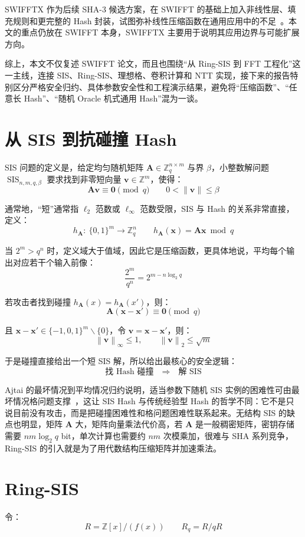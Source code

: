 \documentclass{article}
\newcommand{\norm}[1]{\left\lVert #1 \right\rVert}
\begin{document}
SWIFFTX 作为后续 SHA-3 候选方案，在 SWIFFT 的基础上加入非线性层、填充规则和更完整的 Hash 封装，试图弥补线性压缩函数在通用应用中的不足~\cite{SWIFFTX}。本文的重点仍放在 SWIFFT 本身，SWIFFTX 主要用于说明其应用边界与可能扩展方向。

综上，本文不仅复述 SWIFFT 论文，而且也围绕“从 Ring-SIS 到 FFT 工程化”这一主线，连接 SIS、Ring-SIS、理想格、卷积计算和 NTT 实现，接下来的报告特别区分严格安全归约、具体参数安全性和工程演示结果，避免将“压缩函数”、“任意长 Hash”、“随机 Oracle 机式通用 Hash”混为一谈。



\section{从 SIS 到抗碰撞 Hash}
SIS 问题的定义是，给定均匀随机矩阵 $\bm{A}\in\mathbb{Z}_{q}^{n\times m}$ 与界 $\beta$，小整数解问题 $\operatorname{SIS}_{n,m,q,\beta}$ 要求找到非零短向量 $\bm{v}\in\mathbb{Z}^{m}$，使得：
\[ \bm{A}\bm{v}\equiv\bm{0}\pmod q\qquad 0<\|\bm{v}\|\leqslant\beta \]

通常地，“短”通常指 $\ell_2$ 范数或 $\ell_{\infty}$ 范数受限，SIS 与 Hash 的关系非常直接，定义：
\[ h_{\bm{A}}:\ \{0,1\}^{m}\to\mathbb{Z}_{q}^{n}\qquad h_{\bm{A}}(\bm{x})=\bm{A}\bm{x}\bmod q \]

当 $2^{m}>q^{n}$ 时，定义域大于值域，因此它是压缩函数，更具体地说，平均每个输出对应若干个输入前像：
\[ \dfrac{2^m}{q^n}=2^{m-n\log_2q} \]

若攻击者找到碰撞 $h_{\bm{A}}(x)=h_{\bm{A}}(x')$，则：
\[ \bm{A}(\bm{x}-\bm{x}')\equiv\bm{0}\pmod q \]

且 $\bm{x}-\bm{x}'\in\{-1,0,1\}^{m}\backslash\{0\}$，令 $\bm{v}=\bm{x}-\bm{x}'$，则：
\[ \norm{\bm{v}}_\infty\leqslant1,\qquad\norm{\bm{v}}_2\leqslant\sqrt{m} \]

于是碰撞直接给出一个短 SIS 解，所以给出最核心的安全逻辑：
\[ \text{找 Hash 碰撞}\quad\Longrightarrow\quad\text{解 SIS} \]

Ajtai 的最坏情况到平均情况归约说明，适当参数下随机 SIS 实例的困难性可由最坏情况格问题支撑~\cite{Ajtai96}，这让 SIS Hash 与传统经验型 Hash 的哲学不同：它不是只说目前没有攻击，而是把碰撞困难性和格问题困难性联系起来。无结构 SIS 的缺点也明显，矩阵 $\bm{A}$ 大，矩阵向量乘法代价高，若 $\bm{A}$ 是一般稠密矩阵，密钥存储需要 $nm\log_2q$ bit，单次计算也需要约 $nm$ 次模乘加，很难与 SHA 系列竞争，Ring-SIS 的引入就是为了用代数结构压缩矩阵并加速乘法。



\section{Ring-SIS}
令：
\[ R=\mathbb{Z}[x]/\left(f(x)\right)\qquad R_q=R/qR \]
\end{document}
